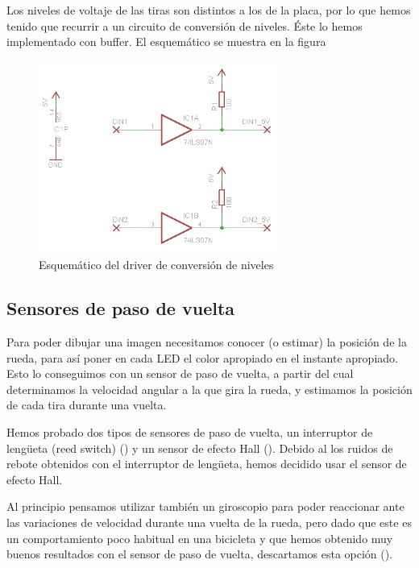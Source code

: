 Los niveles de voltaje de las tiras son distintos a los de la placa, por lo que
hemos tenido que recurrir a un circuito de conversión de niveles. Éste lo hemos
implementado con buffer. El esquemático se muestra en la figura

\begin{figure}[!ht]
	\centering
	\includegraphics[width=0.7\textwidth]{images/tiraLEDs-driver}
	\caption{Esquemático del driver de conversión de niveles}
	\label{fig:tiraLEDs-driver}
\end{figure}

\newpage
\subsection{Sensores de paso de vuelta}
Para poder dibujar una imagen necesitamos conocer (o estimar) la posición de la
rueda, para así poner en cada LED el color apropiado en el instante apropiado.
Esto lo conseguimos con un sensor de paso de vuelta, a partir del cual
determinamos la velocidad angular a la que gira la rueda, y estimamos la
posición de cada tira durante una vuelta.

Hemos probado dos tipos de sensores de paso de vuelta, un interruptor de
lengüeta (reed switch) () y un sensor de
efecto Hall (). Debido al los ruidos de rebote
obtenidos con el interruptor de lengüeta, hemos decidido usar el sensor de
efecto Hall.

Al principio pensamos utilizar también un giroscopio para poder reaccionar ante
las variaciones de velocidad durante una vuelta de la rueda, pero dado que este
es un comportamiento poco habitual en una bicicleta y que hemos obtenido muy
buenos resultados con el sensor de paso de vuelta, descartamos esta opción
().

